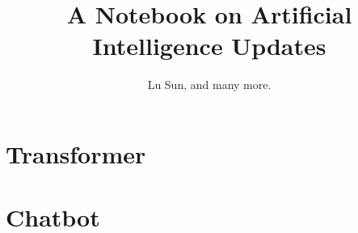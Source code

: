 



\makeindex



\frontmatter

\title{A Notebook on Artificial Intelligence Updates}
\author{Lu Sun, and many more.}

\maketitle


\tableofcontents


\listoffigures
\listoftables

\mainmatter

\part{Transformer}



\part{Chatbot}










\printindex


